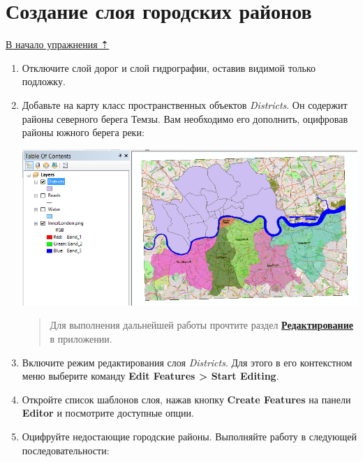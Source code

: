 \documentclass[]{book}
\theoremstyle{definition}
\theoremstyle{definition}
\theoremstyle{definition}
\theoremstyle{remark}
\begin{document}
\hypertarget{map-ref-economic-regions}{%
\section{Создание слоя городских
районов}\label{map-ref-economic-regions}}

\protect\hyperlink{map-ref-economic}{В начало упражнения ⇡}

\begin{enumerate}
\def\labelenumi{\arabic{enumi}.}
\item
  Отключите слой дорог и слой гидрографии, оставив видимой только
  подложку.
\item
  Добавьте на карту класс пространственных объектов \emph{Districts}. Он
  содержит районы северного берега Темзы. Вам необходимо его дополнить,
  оцифровав районы южного берега реки:

  \includegraphics{images/Ex07/image12.png}

  \begin{quote}
  Для выполнения дальнейшей работы прочтите раздел
  \textbf{\protect\hyperlink{manual-edit}{Редактирование}} в приложении.
  \end{quote}
\item
  Включите режим редактирования слоя \emph{Districts}. Для этого в его
  контекстном меню выберите команду \textbf{Edit Features \textgreater{}
  Start Editing}.
\item
  Откройте список шаблонов слоя, нажав кнопку \textbf{Create Features}
  на панели \textbf{Editor} и посмотрите доступные опции.
\item
  Оцифруйте недостающие городские районы. Выполняйте работу в следующей
  последовательности:


\end{enumerate}
\end{document}
